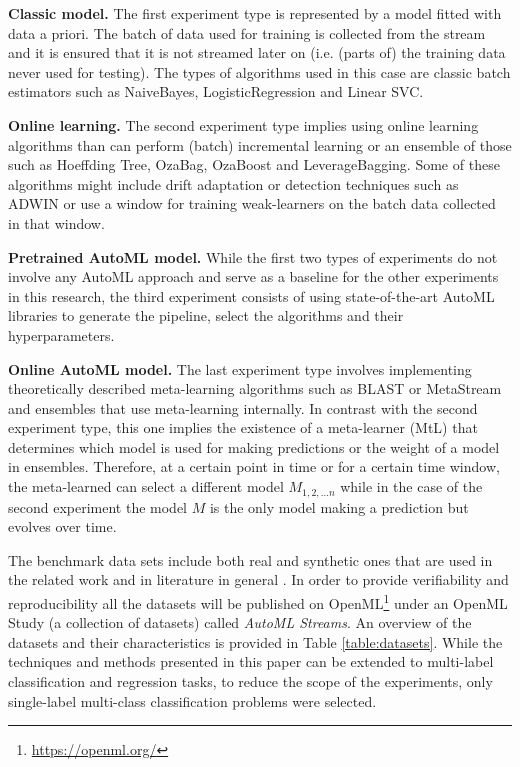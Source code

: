 \documentclass{sig-alternate-br}
\begin{document}
\textbf{Classic model.} The first experiment type is represented by a model fitted with data a priori. The batch of data used for training is collected from the stream and it is ensured that it is not streamed later on (i.e. (parts of) the training data never used for testing). The types of algorithms used in this case are classic batch estimators such as NaiveBayes, LogisticRegression and Linear SVC.

\textbf{Online learning.} The second experiment type implies using online learning algorithms than can perform (batch) incremental learning or an ensemble of those such as Hoeffding Tree, OzaBag, OzaBoost and LeverageBagging. Some of these algorithms might include drift adaptation or detection techniques such as ADWIN or use a window for training weak-learners on the batch data collected in that window.  

\textbf{Pretrained AutoML model.} While the first two types of experiments do not involve any AutoML approach and serve as a baseline for the other experiments in this research, the third experiment consists of using state-of-the-art AutoML libraries to generate the pipeline, select the algorithms and their hyperparameters. 

\textbf{Online AutoML model.} The last experiment type involves implementing theoretically described meta-learning algorithms such as BLAST or MetaStream and ensembles that use meta-learning internally. In contrast with the second experiment type, this one implies the existence of a meta-learner (MtL) that determines which model is used for making predictions or the weight of a model in ensembles. Therefore, at a certain point in time or for a certain time window, the meta-learned can select a different model $M_{1,2, ... n}$ while in the case of the second experiment the model $M$ is the only model making a prediction but evolves over time.

The benchmark data sets include both real and synthetic ones that are used in the related work and in literature in general \cite{van2016massively}. In order to provide verifiability and reproducibility all the datasets will be published on OpenML\footnote{\url{https://openml.org/}} under an OpenML Study (a collection of datasets) called \textit{AutoML Streams}. An overview of the datasets and their characteristics is provided in Table \ref{table:datasets}. While the techniques and methods presented in this paper can be extended to multi-label classification and regression tasks, to reduce the scope of the experiments, only single-label multi-class classification problems were selected.   
\end{document}
